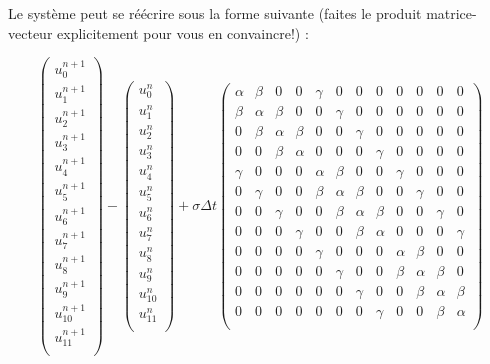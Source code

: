 \documentclass[11pt]{article}
\begin{document}
Le système peut se réécrire sous la forme suivante (faites le produit matrice-vecteur explicitement pour vous en convaincre!) :

\setcounter{MaxMatrixCols}{12}
\begin{equation}
\left(
\begin{array}{c}
u^{n+1}_{0}\\
u^{n+1}_{1}\\
u^{n+1}_{2}\\
u^{n+1}_{3}\\
u^{n+1}_{4}\\
u^{n+1}_{5}\\
u^{n+1}_{6}\\
u^{n+1}_{7}\\
u^{n+1}_{8}\\
u^{n+1}_{9}\\
u^{n+1}_{10}\\
u^{n+1}_{11}\\
\end{array}
\right)
-
\left(
\begin{array}{c}
u^{n}_{0}\\
u^{n}_{1}\\
u^{n}_{2}\\
u^{n}_{3}\\
u^{n}_{4}\\
u^{n}_{5}\\
u^{n}_{6}\\
u^{n}_{7}\\
u^{n}_{8}\\
u^{n}_{9}\\
u^{n}_{10}\\
u^{n}_{11}\\
\end{array}
\right)
+ 
\sigma \Delta t 
\begin{pmatrix}
\alpha & \beta & 0 & 0 & \gamma & 0 & 0 & 0 & 0 & 0 & 0 & 0 \\
\beta & \alpha & \beta & 0 & 0 & \gamma & 0 & 0 & 0 & 0 & 0 & 0 \\
0 & \beta & \alpha & \beta & 0 & 0 & \gamma & 0 & 0 & 0 & 0 & 0 \\
0 & 0 & \beta & \alpha & 0 & 0 & 0 & \gamma & 0 & 0 & 0 & 0 \\
\gamma & 0 & 0 & 0 & \alpha & \beta & 0 & 0 & \gamma & 0 & 0 & 0 \\
0 & \gamma & 0 & 0 & \beta & \alpha & \beta & 0 & 0 & \gamma & 0 & 0 \\
0 & 0 & \gamma & 0 & 0 & \beta & \alpha & \beta & 0 & 0 & \gamma & 0 \\
0 & 0 & 0 & \gamma & 0 & 0 & \beta & \alpha & 0 & 0 & 0 & \gamma \\
0 & 0 & 0 & 0 & \gamma & 0 & 0 & 0 & \alpha & \beta & 0 & 0 \\
0 & 0 & 0 & 0 & 0 & \gamma & 0 & 0 & \beta & \alpha & \beta & 0 \\
0 & 0 & 0 & 0 & 0 & 0 & \gamma & 0 & 0 & \beta & \alpha & \beta \\
0 & 0 & 0 & 0 & 0 & 0 & 0 & \gamma & 0 & 0 & \beta & \alpha \\


\end{pmatrix}
\end{equation}
\end{document}
